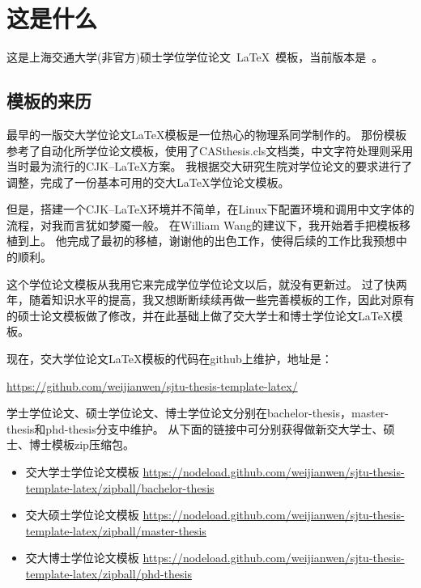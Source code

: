 
\chapter{这是什么}
\label{chap:what}

这是上海交通大学(非官方)硕士学位学位论文~\LaTeX~模板，当前版本是~\version。

\section{模板的来历}

最早的一版交大学位论文\LaTeX{}模板是一位热心的物理系同学制作的。
那份模板参考了自动化所学位论文模板，使用了CASthesis.cls文档类，中文字符处理则采用当时最为流行的CJK--\LaTeX{}方案。
我根据交大研究生院对学位论文的要求进行了调整，完成了一份基本可用的交大\LaTeX{}学位论文模板。

但是，搭建一个CJK--\LaTeX{}环境并不简单，在Linux下配置环境和调用中文字体的流程，对我而言犹如梦魇一般。
在William Wang的建议下，我开始着手把模板移植到\XeTeX{}上。
他完成了最初的移植，谢谢他的出色工作，使得后续的工作比我预想中的顺利。

这个学位论文模板从我用它来完成学位学位论文以后，就没有更新过。
过了快两年，随着知识水平的提高，我又想断断续续再做一些完善模板的工作，因此对原有的硕士论文模板做了修改，并在此基础上做了交大学士和博士学位论文\LaTeX{}模板。

现在，交大学位论文\LaTeX{}模板的代码在github上维护，地址是：

	\url{https://github.com/weijianwen/sjtu-thesis-template-latex/}

学士学位论文、硕士学位论文、博士学位论文分别在bachelor-thesis，master-thesis和phd-thesis分支中维护。
从下面的链接中可分别获得做新交大学士、硕士、博士模板zip压缩包。

\begin{itemize}
	\item 交大学士学位论文模板 \url{https://nodeload.github.com/weijianwen/sjtu-thesis-template-latex/zipball/bachelor-thesis}
	\item 交大硕士学位论文模板 \url{https://nodeload.github.com/weijianwen/sjtu-thesis-template-latex/zipball/master-thesis}
	\item 交大博士学位论文模板 \url{https://nodeload.github.com/weijianwen/sjtu-thesis-template-latex/zipball/phd-thesis}
\end{itemize}

